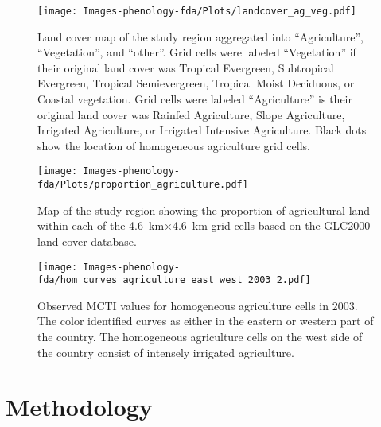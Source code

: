 \begin{figure}
	[htbp] \centering 
	\texttt{[image: Images-phenology-fda/Plots/landcover\_ag\_veg.pdf]} \caption{Land cover map of the study region aggregated into ``Agriculture'', ``Vegetation'', and ``other''. Grid cells were labeled ``Vegetation'' if their original land cover was Tropical Evergreen, Subtropical Evergreen, Tropical Semievergreen, Tropical Moist Deciduous, or Coastal vegetation. Grid cells were labeled ``Agriculture'' is their original land cover was Rainfed Agriculture, Slope Agriculture, Irrigated Agriculture, or Irrigated Intensive Agriculture. Black dots show the location of homogeneous agriculture grid cells.} \label{fig:land cover ag vs. veg} 
\end{figure}
\begin{figure}
	[htbp] \centering 
	\texttt{[image: Images-phenology-fda/Plots/proportion\_agriculture.pdf]} \caption{Map of the study region showing the proportion of agricultural land within each of the 4.6~km$\times$4.6~km grid cells based on the GLC2000 land cover database. } \label{fig:proportion agriculture} 
\end{figure}


\begin{figure}
	[htbp] \centering 
	\texttt{[image: Images-phenology-fda/hom\_curves\_agriculture\_east\_west\_2003\_2.pdf]} \caption{Observed MCTI values for homogeneous agriculture cells in 2003. The color identified curves as either in the eastern or western part of the country. The homogeneous agriculture cells on the west side of the country consist of intensely irrigated agriculture. } \label{fig:ag cell east vs west} 
\end{figure}


\section{Methodology} 
\label{sec:methodology}

